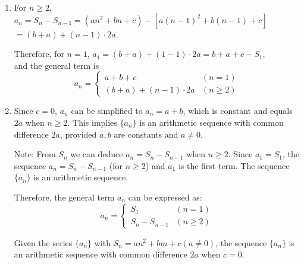 \documentclass[
	12pt, %
	fleqn, %
	a4paper, %
]{LegrandOrangeBook}
\begin{document}
\begin{enumerate}
    \item For \( n \geq 2 \), \( a_n = S_n - S_{n-1} = (an^2 + bn + c) - [a(n-1)^2 + b(n-1) + c] \) \\
    \( = (b+a) + (n-1) \cdot 2a \),
    
    Therefore, for \( n=1 \), \( a_1 = (b+a) + (1-1) \cdot 2a = b + a + c - S_1 \), \\
    and the general term is
    \[
    a_n = 
    \begin{cases}
        a + b + c & (n=1) \\
        (b+a) + (n-1) \cdot 2a & (n \geq 2)
    \end{cases}
    \]

    \item Since \( c = 0 \), \( a_n \) can be simplified to \( a_n = a + b \), which is constant and equals \( 2a \) when \( n \geq 2 \). This implies \( \{a_n\} \) is an arithmetic sequence with common difference \( 2a \), provided \( a, b \) are constants and \( a \neq 0 \).
    
    Note: From \( S_n \) we can deduce \( a_n = S_n - S_{n-1} \) when \( n \geq 2 \). Since \( a_1 = S_1 \), the sequence \( a_n = S_n - S_{n-1} \) (for \( n \geq 2 \)) and \( a_1 \) is the first term. The sequence \( \{a_n\} \) is an arithmetic sequence.
    
    Therefore, the general term \( a_n \) can be expressed as:
    \[
    a_n = 
    \begin{cases}
        S_1 & (n=1) \\
        S_n - S_{n-1} & (n \geq 2)
    \end{cases}
    \]
    
    Given the series \( \{a_n\} \) with \( S_n = an^2 + bm + c (a \neq 0) \), the sequence \( \{a_n\} \) is an arithmetic sequence with common difference \( 2a \) when \( c = 0 \).
\end{enumerate}
\end{document}
